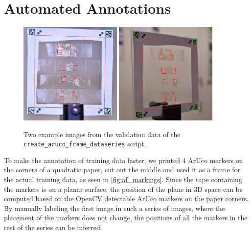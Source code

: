 \documentclass[10pt]{book}
\newcommand{\figureref}[1]{\autoref{#1}}
\begin{document}
\section{Automated Annotations}
\label{sec:auto_annots}

\begin{figure}
  \centering
     {\includegraphics[width=0.45\textwidth]{image/af_markings_1}}
     {\includegraphics[width=0.45\textwidth]{image/af_markings_2}}
  \caption{Two example images from the validation data of the \texttt{create\_aruco\_frame\_dataseries} script.}
  \label{fig:af_markings}
\end{figure}

To make the annotation of training data faster, we printed 4 \ac{ArUco} markers on the corners of a quadratic paper, cut out the middle and used it as a frame for the actual training data, as seen in \figureref{fig:af_markings}. Since the tape containing the markers is on a planar surface, the position of the plane in 3D space can be computed based on the \ac{OpenCV} detectable \ac{ArUco} markers on the paper corners. By manually labeling the first image in such a series of images, where the placement of the markers does not change, the positions of all the markers in the rest of the series can be inferred.
\end{document}
